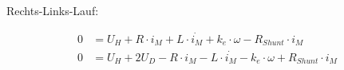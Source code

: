 Rechts-Links-Lauf:

\begin{equation} \label{eq411}
    \begin{split}
        0 &= U_H + R \cdot i_M + L \cdot \dot{i_M} + k_e \cdot \omega - R_{Shunt} \cdot i_M\\
        0 &= U_H + 2 U_D - R \cdot i_M - L \cdot \dot{i_M} - k_e \cdot \omega + R_{Shunt} \cdot i_M
    \end{split}
\end{equation}




